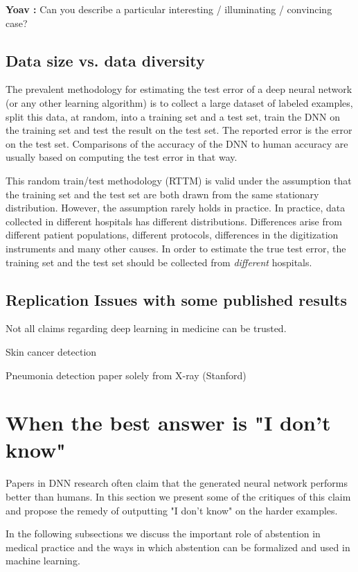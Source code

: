 \documentclass[10pt]{wlscirep}
\newcommand{\comment}[3]{{\color{#1} {\bf #2 :} #3}}
\newcommand{\yoav}[1]{\comment{red}{Yoav}{#1}}
\begin{document}
\yoav{ Can you describe a particular interesting / illuminating / convincing case?}


\subsection*{Data size vs. data diversity}
The prevalent methodology for estimating the test error of a deep neural network (or any other learning algorithm) is to 
collect a large dataset of labeled examples, split this data, at random, into a training set and a test set, train the DNN on the training set and test the result on the test set. The reported error is the error on the test set. Comparisons of the accuracy of the DNN to human accuracy are usually based on computing the test error in that way.

This random train/test methodology (RTTM) is valid under the assumption that the training set and the test set are both drawn 
from the same stationary distribution. However, the assumption rarely holds in practice. In practice, data collected in different hospitals has different distributions. Differences arise from different patient populations, different protocols, differences in the digitization instruments and many other causes. In order to estimate the true test error, the training set and the test set should be collected from {\em different} hospitals.


\subsection*{Replication Issues with some published results}
Not all claims regarding deep learning in medicine can be trusted.

Skin cancer detection~\cite{esteva2017dermatologist}

Pneumonia detection paper solely from X-ray (Stanford)

\section{When the best answer is "I don't know"}

Papers in DNN research often claim that the generated neural network performs better than humans. In this section we present some of the critiques of this claim and propose the remedy of outputting "I don't know" on the harder examples.

In the following subsections we discuss the important role of abstention in medical practice and the ways in which abstention can be formalized and used in machine learning.
\end{document}

